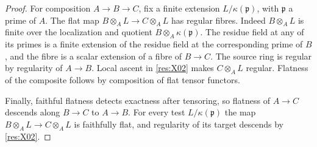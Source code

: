 \begin{proof}
For composition \(A\to B\to C\), fix a finite extension \(L/\kappa(\mathfrak p)\), with \(\mathfrak p\) a prime of \(A\). The flat map \(B\otimes_A L\to C\otimes_A L\) has regular fibres. Indeed \(B\otimes_A L\) is finite over the localization and quotient \(B\otimes_A\kappa(\mathfrak p)\). The residue field at any of its primes is a finite extension of the residue field at the corresponding prime of \(B\), and the fibre is a scalar extension of a fibre of \(B\to C\). The source ring is regular by regularity of \(A\to B\). Local ascent in \ref{res:X02} makes \(C\otimes_A L\) regular. Flatness of the composite follows by composition of flat tensor functors.

Finally, faithful flatness detects exactness after tensoring, so flatness of \(A\to C\) descends along \(B\to C\) to \(A\to B\). For every test \(L/\kappa(\mathfrak p)\) the map \(B\otimes_A L\to C\otimes_A L\) is faithfully flat, and regularity of its target descends by \ref{res:X02}.
\end{proof}

